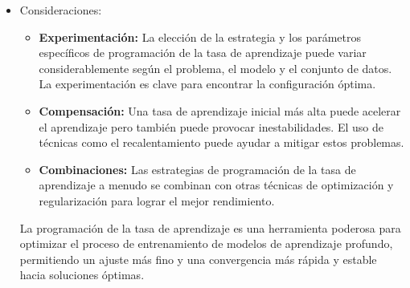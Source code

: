 \documentclass[11pt]{article}
\begin{document}
\begin{itemize}
\begin{verbatim}
lr_schedule = tfa.optimizers.CyclicalLearningRate(
    initial_learning_rate=1e-5,
    maximal_learning_rate=1e-2,
    step_size=2000,
    scale_fn=lambda x: 1.,
    scale_mode='cycle')

optimizer = tf.keras.optimizers.Adam(learning_rate=lr_schedule)
\end{verbatim}

\item Consideraciones:
\label{sec:orgdf5a30f}
\begin{itemize}
\item \textbf{Experimentación:} La elección de la estrategia y los parámetros
específicos de programación de la tasa de aprendizaje puede variar
considerablemente según el problema, el modelo y el conjunto de datos.
La experimentación es clave para encontrar la configuración óptima.
\item \textbf{Compensación:} Una tasa de aprendizaje inicial más alta puede
acelerar el aprendizaje pero también puede provocar inestabilidades.
El uso de técnicas como el recalentamiento puede ayudar a mitigar
estos problemas.
\item \textbf{Combinaciones:} Las estrategias de programación de la tasa de
aprendizaje a menudo se combinan con otras técnicas de optimización y
regularización para lograr el mejor rendimiento.
\end{itemize}

La programación de la tasa de aprendizaje es una herramienta poderosa
para optimizar el proceso de entrenamiento de modelos de aprendizaje
profundo, permitiendo un ajuste más fino y una convergencia más rápida y
estable hacia soluciones óptimas.
\end{itemize}
\end{document}
